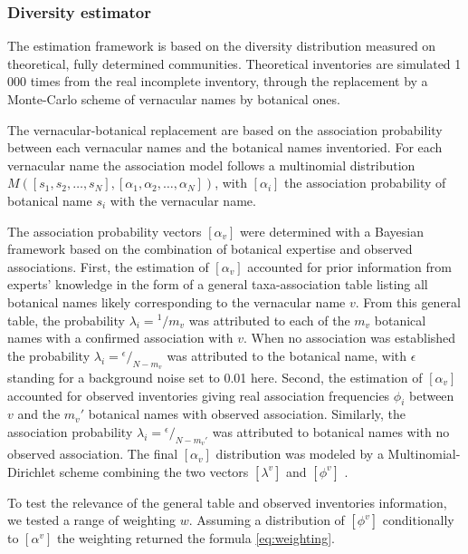 \documentclass[
  11pt,
  french,
  A4paper,
  extrafontsizes,onecolumn,openright
  ]{memoir}
\begin{document}
\subsubsection{Diversity estimator}\label{diversity-estimator}

The estimation framework is based on the diversity distribution measured
on theoretical, fully determined communities. Theoretical inventories
are simulated 1 000 times from the real incomplete inventory, through
the replacement by a Monte-Carlo scheme of vernacular names by botanical
ones.

The vernacular-botanical replacement are based on the association
probability between each vernacular names and the botanical names
inventoried. For each vernacular name the association model follows a
multinomial distribution
\(M([s_1, s_2, …, s_N] ,[\alpha_1, \alpha_2,…, \alpha_N])\), with
\([\alpha_i]\) the association probability of botanical name \(s_i\)
with the vernacular name.

The association probability vectors \([\alpha_v]\) were determined with
a Bayesian framework based on the combination of botanical expertise and
observed associations. First, the estimation of \([\alpha_v]\) accounted
for prior information from experts' knowledge in the form of a general
taxa-association table listing all botanical names likely corresponding
to the vernacular name \(v\). From this general table, the probability
\(\lambda_i={}^1/m_v\) was attributed to each of the \(m_v\) botanical
names with a confirmed association with \(v\). When no association was
established the probability \(\lambda_i={}^\epsilon\big/_{N-m_v}\) was
attributed to the botanical name, with \(\epsilon\) standing for a
background noise set to 0.01 here. Second, the estimation of
\([\alpha_v]\) accounted for observed inventories giving real
association frequencies \(\phi_i\) between \(v\) and the \(m_v'\)
botanical names with observed association. Similarly, the association
probability \(\lambda_i={}^\epsilon\big/_{N-m_v'}\) was attributed to
botanical names with no observed association. The final \([\alpha_v]\)
distribution was modeled by a Multinomial-Dirichlet scheme combining the
two vectors \([\lambda^v]\) and \([\phi^v]\) \autocite{McCarthy2007}.

To test the relevance of the general table and observed inventories
information, we tested a range of weighting \(w\). Assuming a
distribution of \([\phi^v]\) conditionally to \([\alpha^v]\) the
weighting returned the formula \eqref{eq:weighting}.
\end{document}
